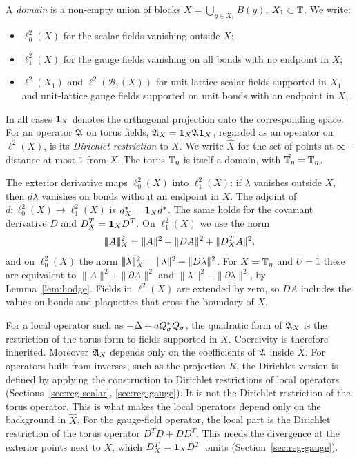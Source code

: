 \begin{definition}[Domains]\label{def:domain}
A \emph{domain} is a non-empty union of blocks $X=\bigcup_{y\in X_1}B(y)$, $X_1\subset\mathbb T$. We write:
\begin{itemize}
\item $\ell^2_0(X)$ for the scalar fields vanishing outside $X$;
\item $\ell^2_1(X)$ for the gauge fields vanishing on all bonds with no endpoint in $X$;
\item $\ell^2(X_1)$ and $\ell^2(\mathcal B_1(X))$ for unit-lattice scalar fields supported in $X_1$ and unit-lattice gauge fields supported on unit bonds with an endpoint in $X_1$.
\end{itemize}
In all cases $\mathbf 1_X$ denotes the orthogonal projection onto the corresponding space. For an operator $\mathfrak A$ on torus fields, $\mathfrak A_X=\mathbf 1_X\mathfrak A\mathbf 1_X$, regarded as an operator on $\ell^2(X)$, is its \emph{Dirichlet restriction} to $X$. We write $\hat X$ for the set of points at $\infty$-distance at most $1$ from $X$. The torus $\mathbb T_\eta$ is itself a domain, with $\hat{\mathbb T_\eta}=\mathbb T_\eta$.
\end{definition}

The exterior derivative maps $\ell^2_0(X)$ into $\ell^2_1(X)$: if $\lambda$ vanishes outside $X$, then $d\lambda$ vanishes on bonds without an endpoint in $X$. The adjoint of $d:\ell^2_0(X)\to\ell^2_1(X)$ is $d^*_X=\mathbf 1_Xd^*$. The same holds for the covariant derivative $D$ and $D^T_X=\mathbf 1_XD^T$. On $\ell^2_1(X)$ we use the norm
\[
|\!|\!|A|\!|\!|_X^2=\|A\|^2+\|DA\|^2+\|D^T_XA\|^2 ,
\]
and on $\ell^2_0(X)$ the norm $|\!|\!|\lambda|\!|\!|_X^2=\|\lambda\|^2+\|D\lambda\|^2$. For $X=\mathbb T_\eta$ and $U=1$ these are equivalent to $\|A\|^2+\|\partial A\|^2$ and $\|\lambda\|^2+\|\partial\lambda\|^2$, by Lemma~\ref{lem:hodge}. Fields in $\ell^2(X)$ are extended by zero, so $DA$ includes the values on bonds and plaquettes that cross the boundary of $X$.

\begin{remark}\label{x:17.2}
For a local operator such as $-\Delta+aQ_\sigma^*Q_\sigma$, the quadratic form of $\mathfrak A_X$ is the restriction of the torus form to fields supported in $X$. Coercivity is therefore inherited. Moreover $\mathfrak A_X$ depends only on the coefficients of $\mathfrak A$ inside $\hat X$. For operators built from inverses, such as the projection $R$, the Dirichlet version is defined by applying the construction to Dirichlet restrictions of local operators (Sections~\ref{sec:reg-scalar}, \ref{sec:reg-gauge}). It is not the Dirichlet restriction of the torus operator. This is what makes the local operators depend only on the background in $\hat X$. For the gauge-field operator, the local part is the Dirichlet restriction of the torus operator $D^TD+DD^T$. This needs the divergence at the exterior points next to $X$, which $D^T_X=\mathbf 1_XD^T$ omits (Section~\ref{sec:reg-gauge}).
\end{remark}

